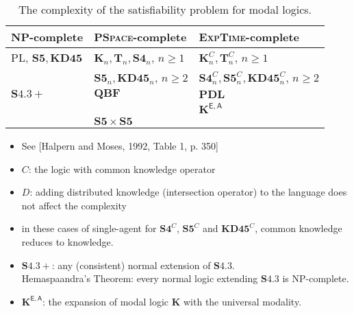 \documentclass[a4paper,12pt]{article}
\begin{document}
\begin{table}[htp!]
    \caption{The complexity of the satisfiability problem for modal logics.}
    \vspace{1em}
    \begin{center}
    \label{tab: complexity-of-modal-logic}
    \renewcommand{\arraystretch}{1.5} %
    \renewcommand{\arraycolsep}{1.2} %
    \begin{tabular}{lll}
    \hline
    NP-complete & \textsc{PSpace}-complete &  \textsc{ExpTime}-complete  \\
    \hline

    PL, $\mathbf{S5}, \mathbf{KD45}$ 
    & 
    $\mathbf{K}_n, \mathbf{T}_n, \mathbf{S4}_n$, $n \geq 1$
    & 
    $\mathbf{K}^C_n, \mathbf{T}^C_n$, $n \geq 1$
    \\


    & 
    $\mathbf{S5}_n, \mathbf{KD45}_n$, $n \geq 2$ 
    &
    $\mathbf{S4}^C_n,\mathbf{S5}^C_n, \mathbf{KD45}^C_n$, $n \geq 2$ 
    \\


    $\mathbf{S4.3}+$
    & 
    $\mathbf{QBF}$ 
    &   
    $\mathbf{PDL}$ \\

    &
    &
    $\mathbf{K}^{\mathsf{E,A}}$ \\

    &
    $\mathbf{S5} \times \mathbf{S5}$ 
    &  \\ 


    \hline
\end{tabular}
\end{center}



\begin{itemize}
    \item See [Halpern and Moses, 1992, Table 1, p. 350]
    \item $C$: the logic with common knowledge operator
    \item $D$: adding distributed knowledge (intersection operator) to the language does not affect the complexity
    
    \item  in these cases of single-agent for $\mathbf{S4}^C$, $\mathbf{S5}^C$ and $\mathbf{KD45}^C$, 
     common knowledge reduces to knowledge. 

     \item 
     $\mathbf{S4.3}+$: any (consistent) normal extension of $\mathbf{S4.3}$. \\
     \textsf{Hemaspaandra's Theorem}: every normal logic extending $\mathbf{S4.3}$ is NP-complete.

     \item 
     $\mathbf{K}^{\mathsf{E,A}}$: 
     the expansion of modal logic $\mathbf{K}$ with the universal modality.
\end{itemize}




\end{table}



\end{document}
